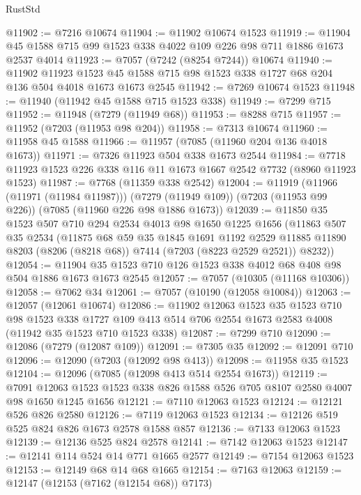 \begin{lexlean}{RustStd}
\begin{coremodule}
@11902 := @7216 @10674
@11904 := @11902 @10674 @1523
@11919 := @11904 @45 @1588 @715 @99 @1523 @338 @4022 @109 @226 @98 @711 @1886 @1673 @2537 @4014
@11923 := @7057 (@7242 (@8254 @7244)) @10674
@11940 := @11902
    @11923
    @1523
    @45
    @1588
    @715
    @98
    @1523
    @338
    @1727
    @68
    @204
    @136
    @504
    @4018
    @1673
    @1673
    @2545
@11942 := @7269 @10674 @1523
@11948 := @11940 (@11942 @45 @1588 @715 @1523 @338)
@11949 := @7299 @715
@11952 := @11948 (@7279 (@11949 @68))
@11953 := @8288 @715
@11957 := @11952 (@7203 (@11953 @98 @204))
@11958 := @7313 @10674
@11960 := @11958 @45 @1588
@11966 := @11957 (@7085 (@11960 @204 @136 @4018 @1673))
@11971 := @7326 @11923 @504 @338 @1673 @2544
@11984 := @7718 @11923 @1523 @226 @338 @116 @11 @1673 @1667 @2542 @7732 (@8960 @11923 @1523)
@11987 := @7768 (@11359 @338 @2542)
@12004 := @11919
    (@11966 (@11971 (@11984 @11987)))
    (@7279 (@11949 @109))
    (@7203 (@11953 @99 @226))
    (@7085 (@11960 @226 @98 @1886 @1673))
@12039 := @11850
    @35
    @1523
    @507
    @710
    @294
    @2534
    @4013
    @98
    @1650
    @1225
    @1656
    (@11863
      @507
      @35
      @2534
      (@11875
        @68
        @59
        @35
        @1845
        @1691
        @1192
        @2529
        @11885
        @11890
        @8203
        (@8206 (@8218 @68))
        @7414
        (@7203 (@8223 @2529 @2521))
        @8232))
@12054 := @11904 @35 @1523 @710 @126 @1523 @338 @4012 @68 @408 @98 @504 @1886 @1673 @1673 @2545
@12057 := @7057 (@10305 (@11168 @10306))
@12058 := @7062 @34
@12061 := @7057 (@10190 (@12058 @10084))
@12063 := @12057 (@12061 @10674)
@12086 := @11902
    @12063
    @1523
    @35
    @1523
    @710
    @98
    @1523
    @338
    @1727
    @109
    @413
    @514
    @706
    @2554
    @1673
    @2583
    @4008
    (@11942 @35 @1523 @710 @1523 @338)
@12087 := @7299 @710
@12090 := @12086 (@7279 (@12087 @109))
@12091 := @7305 @35
@12092 := @12091 @710
@12096 := @12090 (@7203 (@12092 @98 @413))
@12098 := @11958 @35 @1523
@12104 := @12096 (@7085 (@12098 @413 @514 @2554 @1673))
@12119 := @7091 @12063 @1523 @1523 @338 @826 @1588 @526 @705 @8107 @2580 @4007 @98 @1650 @1245 @1656
@12121 := @7110 @12063 @1523
@12124 := @12121 @526 @826 @2580
@12126 := @7119 @12063 @1523
@12134 := @12126 @519 @525 @824 @826 @1673 @2578 @1588 @857
@12136 := @7133 @12063 @1523
@12139 := @12136 @525 @824 @2578
@12141 := @7142 @12063 @1523
@12147 := @12141 @114 @524 @14 @771 @1665 @2577
@12149 := @7154 @12063 @1523
@12153 := @12149 @68 @14 @68 @1665
@12154 := @7163 @12063
@12159 := @12147 (@12153 (@7162 (@12154 @68)) @7173)

\end{coremodule}
\end{lexlean}
